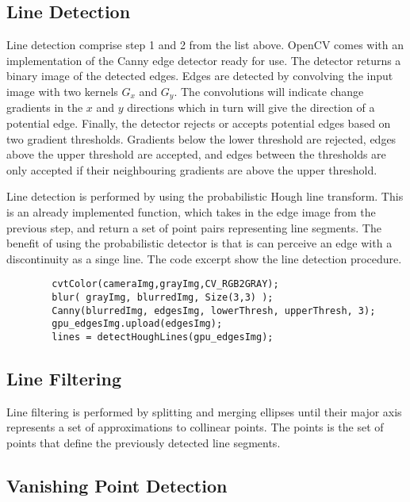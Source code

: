 \subsection{Line Detection}

Line detection comprise step 1 and 2 from the list above. OpenCV comes with an implementation of the Canny edge detector ready for use. The detector returns a binary image of the detected edges. Edges are detected by convolving the input image with two kernels $G_x$ and $G_y$. The convolutions will indicate change gradients in the $x$ and $y$ directions which in turn will give the direction of a potential edge. Finally, the detector rejects or accepts potential edges based on two gradient thresholds. Gradients below the lower threshold are rejected, edges above the upper threshold are accepted, and edges between the thresholds are only accepted if their neighbouring gradients are above the upper threshold\cite{cannyedge}. 

Line detection is performed by using the probabilistic Hough line transform. This is an already implemented function, which takes in the edge image from the previous step, and return a set of point pairs representing line segments. The benefit of using the probabilistic detector is that is can perceive an edge with a discontinuity as a singe line. The code excerpt show the line detection procedure.

\begin{verbatim}
        cvtColor(cameraImg,grayImg,CV_RGB2GRAY);
        blur( grayImg, blurredImg, Size(3,3) );
        Canny(blurredImg, edgesImg, lowerThresh, upperThresh, 3);
        gpu_edgesImg.upload(edgesImg);
        lines = detectHoughLines(gpu_edgesImg);        
\end{verbatim}



\subsection{Line Filtering}

Line filtering is performed by splitting and merging ellipses until their major axis represents a set of approximations to collinear points. The points is the set of points that define the previously detected line segments.

\subsection{Vanishing Point Detection}


